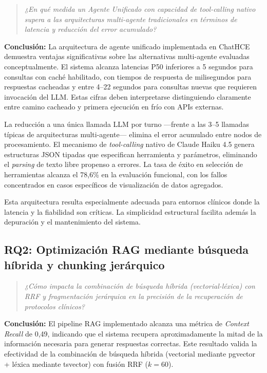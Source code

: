 \begin{quote}
\textit{¿En qué medida un Agente Unificado con capacidad de tool-calling nativo supera a las arquitecturas multi-agente tradicionales en términos de latencia y reducción del error acumulado?}
\end{quote}

\textbf{Conclusión:} La arquitectura de agente unificado implementada en ChatHCE demuestra ventajas significativas sobre las alternativas multi-agente evaluadas conceptualmente. El sistema alcanza latencias P50 inferiores a 5 segundos para consultas con caché habilitado, con tiempos de respuesta de milisegundos para respuestas cacheadas y entre 4--22 segundos para consultas nuevas que requieren invocación del \ac{LLM}. Estas cifras deben interpretarse distinguiendo claramente entre camino cacheado y primera ejecución en frío con APIs externas.

La reducción a una única llamada \ac{LLM} por turno ---frente a las 3--5 llamadas típicas de arquitecturas multi-agente--- elimina el error acumulado entre nodos de procesamiento. El mecanismo de \textit{tool-calling} nativo de Claude Haiku 4.5 genera estructuras \ac{JSON} tipadas que especifican herramienta y parámetros, eliminando el \textit{parsing} de texto libre propenso a errores. La tasa de éxito en selección de herramientas alcanza el 78,6\% en la evaluación funcional, con los fallos concentrados en casos específicos de visualización de datos agregados.

Esta arquitectura resulta especialmente adecuada para entornos clínicos donde la latencia y la fiabilidad son críticas. La simplicidad estructural facilita además la depuración y el mantenimiento del sistema.

\subsection{RQ2: Optimización \acs{RAG} mediante búsqueda híbrida y chunking jerárquico}

\begin{quote}
\textit{¿Cómo impacta la combinación de búsqueda híbrida (vectorial-léxica) con \ac{RRF} y fragmentación jerárquica en la precisión de la recuperación de protocolos clínicos?}
\end{quote}

\textbf{Conclusión:} El pipeline \ac{RAG} implementado alcanza una métrica de \textit{Context Recall} de 0,49, indicando que el sistema recupera aproximadamente la mitad de la información necesaria para generar respuestas correctas. Este resultado valida la efectividad de la combinación de búsqueda híbrida (vectorial mediante pgvector + léxica mediante tsvector) con fusión \ac{RRF} ($k=60$).

